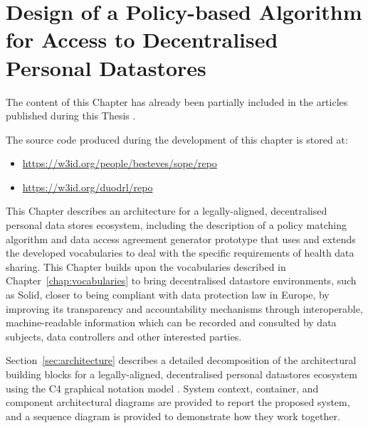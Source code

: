 \chapter{Design of a Policy-based Algorithm for Access to Decentralised Personal Datastores}
\label{chap:matching}

\begin{tcolorbox}[colback=royallavender!40]
The content of this Chapter has already been partially included in the articles published during this Thesis \citep{esteves_odrl_2021,esteves_using_2022,pandit_enhancing_2024}.
\end{tcolorbox}

\begin{tcolorbox}[colback=royallavender!10]
The source code produced during the development of this chapter is stored at:
\begin{itemize}
    \item \url{https://w3id.org/people/besteves/sope/repo}
    \item \url{https://w3id.org/duodrl/repo}
\end{itemize}
\end{tcolorbox}

This Chapter describes an architecture for a legally-aligned, decentralised personal data stores ecosystem, including the description of a policy matching algorithm and data access agreement generator prototype that uses and extends the developed vocabularies to deal with the specific requirements of health data sharing.
This Chapter builds upon the vocabularies described in Chapter~\ref{chap:vocabularies} to bring decentralised datastore environments, such as Solid, closer to being compliant with data protection law in Europe, by improving its transparency and accountability mechanisms through interoperable, machine-readable information which can be recorded and consulted by data subjects, data controllers and other interested parties.

Section~\ref{sec:architecture} describes a detailed decomposition of the architectural building blocks for a legally-aligned, decentralised personal datastores ecosystem using the C4 graphical notation model \citep{brown_c4_2015}.
System context, container, and component architectural diagrams are provided to report the proposed system, and a sequence diagram is provided to demonstrate how they work together.

